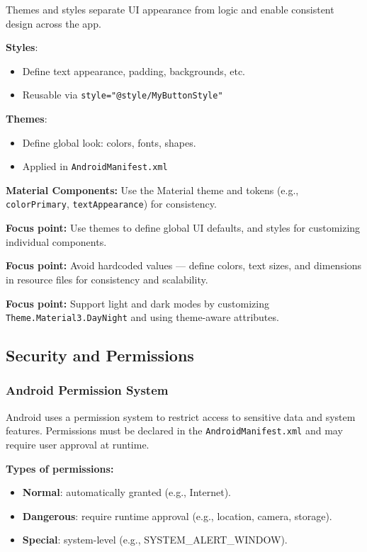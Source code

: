 \documentclass[a4paper,12pt]{article}
\begin{document}
Themes and styles separate UI appearance from logic and enable consistent design across the app.

\textbf{Styles}:
\begin{itemize}
  \item Define text appearance, padding, backgrounds, etc.
  \item Reusable via \texttt{style="@style/MyButtonStyle"}
\end{itemize}

\textbf{Themes}:
\begin{itemize}
  \item Define global look: colors, fonts, shapes.
  \item Applied in \texttt{AndroidManifest.xml}
\end{itemize}

\textbf{Material Components:}
Use the Material theme and tokens (e.g., \texttt{colorPrimary}, \texttt{textAppearance}) for consistency.

\textbf{Focus point:} Use themes to define global UI defaults, and styles for customizing individual components.

\textbf{Focus point:} Avoid hardcoded values — define colors, text sizes, and dimensions in resource files for consistency and scalability.

\textbf{Focus point:} Support light and dark modes by customizing \texttt{Theme.Material3.DayNight} and using theme-aware attributes.

\subsection{Security and Permissions}

\subsubsection{Android Permission System}

Android uses a permission system to restrict access to sensitive data and system features. Permissions must be declared in the \texttt{AndroidManifest.xml} and may require user approval at runtime.

\textbf{Types of permissions:}
\begin{itemize}
  \item \textbf{Normal}: automatically granted (e.g., Internet).
  \item \textbf{Dangerous}: require runtime approval (e.g., location, camera, storage).
  \item \textbf{Special}: system-level (e.g., SYSTEM\_ALERT\_WINDOW).
\end{itemize}
\end{document}
